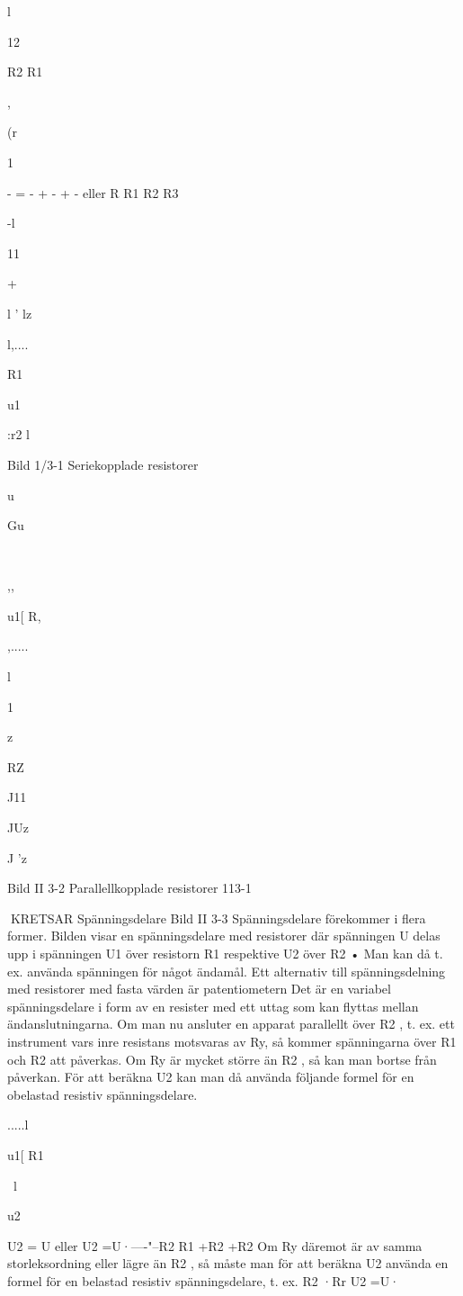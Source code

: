 l

12

R2
R1

,

(r

1

- = - + - + - eller
R R1 R2 R3

-l

11

+

l '
lz

l,....

R1

u1

:r2
l

Bild 1/3-1 Seriekopplade resistorer

u

Gu

~

,,

u1[ R,

,.....

l

1

z

RZ

J11

JUz

J 'z

Bild II 3-2 Parallellkopplade resistorer
113-1

KRETSAR
Spänningsdelare
Bild II 3-3
Spänningsdelare förekommer i flera former.
Bilden visar en spänningsdelare med
resistorer där spänningen U delas upp i
spänningen U1 över resistorn R1 respektive
U2 över R2 • Man kan då t. ex. använda spänningen
för något ändamål.
Ett alternativ till spänningsdelning med
resistorer med fasta värden är patentiometern Det är en variabel spänningsdelare i
form av en resister med ett uttag som kan
flyttas mellan ändanslutningarna.
Om man nu ansluter en apparat parallellt
över R2 , t. ex. ett instrument vars inre resistans motsvaras av Ry, så kommer spänningarna över R1 och R2 att påverkas.
Om Ry är mycket större än R2 , så kan
man bortse från påverkan. För att beräkna
U2 kan man då använda följande formel för
en obelastad resistiv spänningsdelare.

.....l

u1[ R1

~l

u2

U2 =
U
eller
U2 =U·----"--R2 R1 +R2
+R2
Om Ry däremot är av samma storleksordning eller lägre än R2 , så måste man för
att beräkna U2 använda en formel för en
belastad resistiv spänningsdelare, t. ex.
R2 ·Rr
U2 =U·


